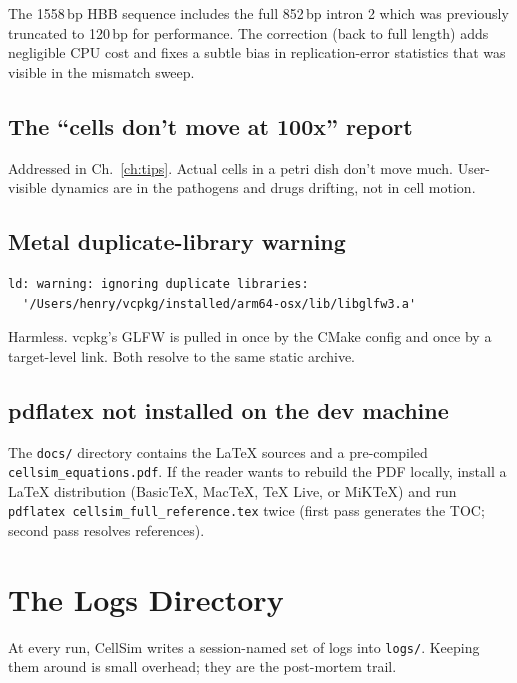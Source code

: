 \documentclass[11pt,letterpaper,twoside,openany]{book}
\newcommand{\file}[1]{\texttt{\small#1}}
\begin{document}
The 1558\,bp HBB sequence includes the full 852\,bp intron 2 which
was previously truncated to 120\,bp for performance. The correction
(back to full length) adds negligible CPU cost and fixes a subtle
bias in replication-error statistics that was visible in the
mismatch sweep.

\section{The ``cells don't move at 100x'' report}

Addressed in Ch.~\ref{ch:tips}. Actual cells in a petri dish don't
move much. User-visible dynamics are in the pathogens and drugs
drifting, not in cell motion.

\section{Metal duplicate-library warning}

\begin{verbatim}
ld: warning: ignoring duplicate libraries:
  '/Users/henry/vcpkg/installed/arm64-osx/lib/libglfw3.a'
\end{verbatim}
Harmless. vcpkg's GLFW is pulled in once by the CMake config and
once by a target-level link. Both resolve to the same static
archive.

\section{pdflatex not installed on the dev machine}

The \file{docs/} directory contains the LaTeX sources and a
pre-compiled \file{cellsim\_equations.pdf}. If the reader wants to
rebuild the PDF locally, install a LaTeX distribution (BasicTeX,
MacTeX, TeX Live, or MiKTeX) and run \texttt{pdflatex
cellsim\_full\_reference.tex} twice (first pass generates the TOC;
second pass resolves references).

\chapter{The Logs Directory}
\label{ch:logs}

At every run, CellSim writes a session-named set of logs into
\file{logs/}. Keeping them around is small overhead; they are the
post-mortem trail.
\end{document}
